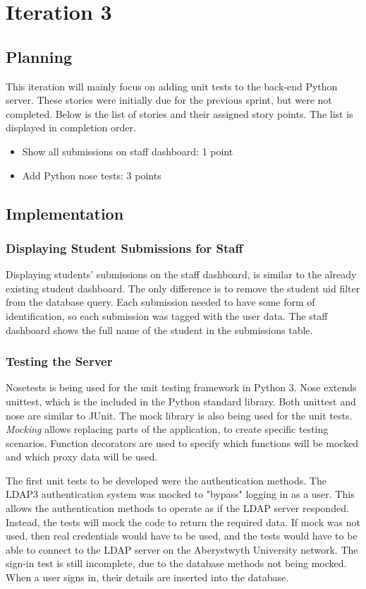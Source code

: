 \chapter{Iteration 3}
\section{Planning}
This iteration will mainly focus on adding unit tests to the back-end Python server. These stories were initially due for the previous sprint, but were not completed. Below is the list of stories and their assigned story points. The list is displayed in completion order.

\begin{itemize}
\item Show all submissions on staff dashboard: 1 point
\item Add Python nose tests: 3 points
\end{itemize}

\section{Implementation}
\subsection{Displaying Student Submissions for Staff}
Displaying students' submissions on the staff dashboard, is similar to the already existing student dashboard. The only difference is to remove the student uid filter from the database query. Each submission needed to have some form of identification, so each submission was tagged with the user data. The staff dashboard shows the full name of the student in the submissions table.

\subsection{Testing the Server}
Nosetests is being used for the unit testing framework in Python 3. Nose extends unittest, which is the included in the Python standard library. Both unittest and nose are similar to JUnit. The mock library is also being used for the unit tests. \textit{Mocking} allows replacing parts of the application, to create specific testing scenarios. Function decorators are used to specify which functions will be mocked and which proxy data will be used.

The first unit tests to be developed were the authentication methods. The LDAP3 authentication system was mocked to "bypass" logging in as a user. This allows the authentication methods to operate as if the LDAP server responded. Instead, the tests will mock the code to return the required data. If mock was not used, then real credentials would have to be used, and the tests would have to be able to connect to the LDAP server on the Aberystwyth University network. The sign-in test is still incomplete, due to the database methods not being mocked. When a user signs in, their details are inserted into the database.

